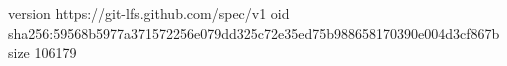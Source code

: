 version https://git-lfs.github.com/spec/v1
oid sha256:59568b5977a371572256e079dd325c72e35ed75b988658170390e004d3cf867b
size 106179
